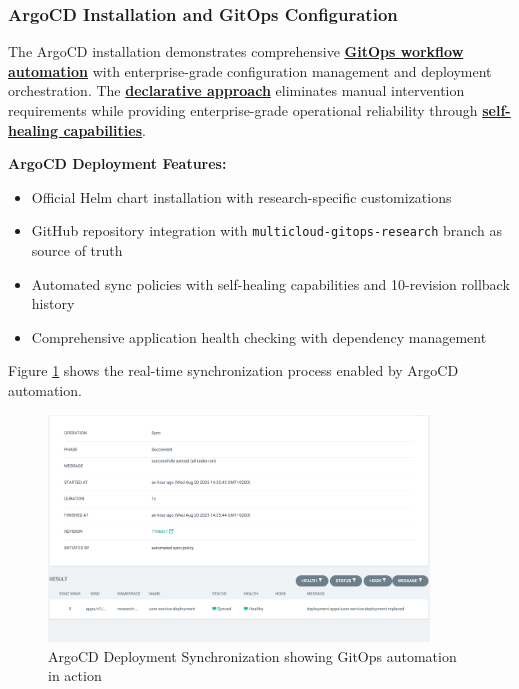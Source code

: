 \subsubsection{ArgoCD Installation and GitOps Configuration}

The ArgoCD installation demonstrates comprehensive \textbf{\hyperref[gitops2021]{GitOps workflow automation}} with enterprise-grade configuration management and deployment orchestration. The \textbf{\hyperref[declarative2022]{declarative approach}} eliminates manual intervention requirements while providing enterprise-grade operational reliability through \textbf{\hyperref[selfhealing2023]{self-healing capabilities}}.

\textbf{ArgoCD Deployment Features:}
\begin{itemize}
\item Official Helm chart installation with research-specific customizations
\item GitHub repository integration with \texttt{multicloud-gitops-research} branch as source of truth
\item Automated sync policies with self-healing capabilities and 10-revision rollback history
\item Comprehensive application health checking with dependency management
\end{itemize}

Figure \ref{fig:argocd-deployment-sync} shows the real-time synchronization process enabled by ArgoCD automation.

\begin{figure}[H]
\centering
\includegraphics[width=0.9\textwidth]{figures/chapter5/argocd-deployment-sync.png}
\caption{ArgoCD Deployment Synchronization showing GitOps automation in action}
\label{fig:argocd-deployment-sync}
\end{figure}

